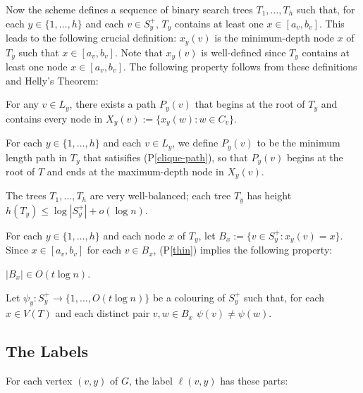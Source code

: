 \documentclass{article}
\newcommand{\pref}[1]{(P\ref{#1})}
\begin{document}
Now the scheme defines a sequence of binary search trees $T_1,\ldots,T_h$ such that, for each $y\in\{1,\ldots,h\}$ and each $v\in S^+_y$, $T_y$ contains at least one $x\in [a_v,b_v]$.  This leads to the following crucial definition: $x_{y}(v)$ is the minimum-depth node $x$ of $T_y$ such that $x\in [a_v,b_v]$. Note that $x_y(v)$ is well-defined since $T_y$ contains at least one node $x\in[a_v,b_v]$.   The following property follows from these definitions and Helly's Theorem:

\begin{compactenum}[(P1)]\setcounter{enumi}{1}
    \item For any $v\in L_y$, there exists a path $P_y(v)$ that begins at the root of $T_y$ and contains every node in $X_y(v):=\{x_{y}(w): w\in C_v\}$.\label{clique-path}
\end{compactenum}

For each $y\in\{1,\ldots,h\}$ and each $v\in L_y$, we define $P_y(v)$ to be the minimum length path in $T_y$ that satisifies \pref{clique-path}, so that $P_y(v)$ begins at the root of $T$ and ends at the maximum-depth node in $X_y(v)$.

The trees $T_1,\ldots,T_h$ are very well-balanced; each tree $T_y$ has height $h(T_y)\le \log|S^+_y|+o(\log n)$.

For each $y\in\{1,\ldots,h\}$ and each node $x$ of $T_y$, let $B_x:=\{v\in S^+_y: x_y(v)=x\}$.  Since $x\in[a_v,b_v]$ for each $v\in B_x$, \pref{thin} implies the following property:
\begin{compactenum}[(P1)]\setcounter{enumi}{2}
    \item $|B_x|\in O(t\log n)$. \label{small-bags-i}
\end{compactenum}
Let $\psi_y:S^+_y\to\{1,\ldots,O(t\log n)\}$ be a colouring of $S^+_y$ such that, for each $x\in V(T)$ and each distinct pair $v,w\in B_x$ $\psi(v)\neq\psi(w)$.

\subsection{The Labels}

For each vertex $(v,y)$ of $G$, the label $\ell(v,y)$ has these parts:
\end{document}
